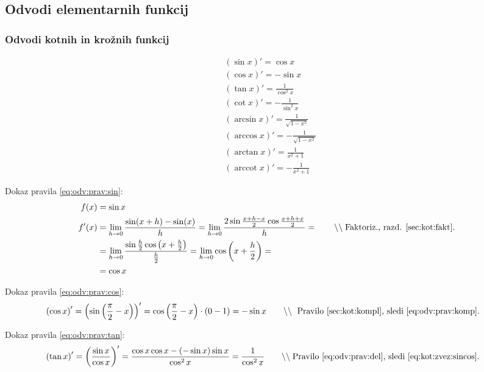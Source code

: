 \documentclass[a4paper,oneside,12pt,fleqn]{article}
\newcommand\krat\cdot
\newcommand{\comment}[1]{\ensuremath{\qquad\backslash\backslash\;}\textnormal{#1}}
\newcommand{\arccot}{\ensuremath{\operatorname{arccot}}} %
\def\kos{\cos}
\def\limh{\lim_{h\rightarrow0}} %
\numberwithin{equation}{section}
\begin{document}
\subsection{Odvodi elementarnih funkcij}
\label{sec:odv:elem}
\subsubsection{Odvodi kotnih in krožnih funkcij}
\label{sec:odv:elem:kot}

\begin{align}
  & \left( \sin x \right)' = \kos x \label{eq:odv:prav:sin} \\
  & \left( \kos x \right)' = -\sin x \label{eq:odv:prav:cos} \\
  & \left( \tan x \right)' = \frac{1}{\kos^2x} \label{eq:odv:prav:tan} \\
  & \left( \cot x \right)' = -\frac{1}{\sin^2x} \label{eq:odv:prav:cot} \\
  & \left( \arcsin x \right)' = \frac{1}{\sqrt{1-x^2}} \label{eq:odv:prav:asin} \\ 
  & \left( \arccos x \right)' = -\frac{1}{\sqrt{1-x^2}} \label{eq:odv:prav:acos} \\ 
  & \left( \arctan x \right)' = \frac{1}{x^2+1} \label{eq:odv:prav:atan} \\ 
  & \left( \arccot x \right)' = -\frac{1}{x^2+1} \label{eq:odv:prav:acot}
\end{align}

Dokaz pravila \eqref{eq:odv:prav:sin}:
\begin{align*}
  f(x) &= \sin x \\
  f'(x) &= \limh\frac{\sin(x+h)-\sin(x)}{h} =
  \limh\frac{2\sin\frac{x+h-x}{2}\cos\frac{x+h+x}{2}}{h} = \comment{Faktoriz., razd. \ref{sec:kot:fakt}.} \\
  &= \limh\frac{\sin\frac{h}{2}\kos\left( x+\frac{h}{2} \right)}{\frac{h}{2}} =
  \limh\kos\left( x+\frac{h}{2} \right) = \\ &= \kos x
\end{align*}

Dokaz pravila \eqref{eq:odv:prav:cos}:
\begin{align*}
  \left( \kos x \right)' &= \left( \sin\left( \frac{\pi}{2} - x \right) \right)' =
  \kos\left( \frac{\pi}{2} - x \right) \krat \left( 0 - 1 \right) = -\sin x
  \comment{ Pravilo \ref{sec:kot:kompl}, sledi \eqref{eq:odv:prav:komp}.}
\end{align*}

Dokaz pravila \eqref{eq:odv:prav:tan}:
\begin{align*}
  \left( \tan x \right)' &= \left( \frac{\sin x}{\kos x} \right)' = \frac{\kos x\kos x -
  \left( -\sin x \right)\sin x}{\kos^2x} = \frac{1}{\kos^2x} \comment{Pravilo
  \ref{eq:odv:prav:del}, sledi \eqref{eq:kot:zvez:sincos}.} 
\end{align*}
\end{document}
